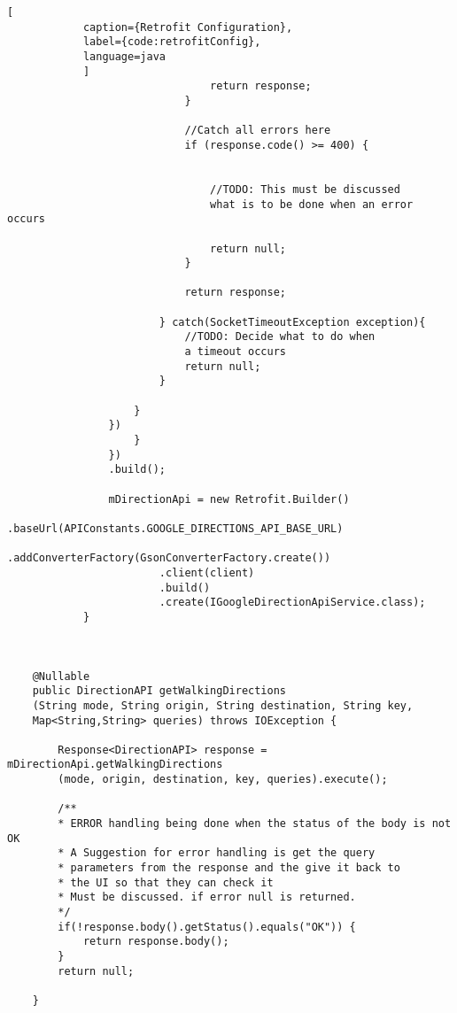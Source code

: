 \begin{lstlisting}[
            caption={Retrofit Configuration},
            label={code:retrofitConfig},
            language=java
            ]
                                return response;
                            }

                            //Catch all errors here
                            if (response.code() >= 400) {


                                //TODO: This must be discussed 
                                what is to be done when an error occurs

                                return null;
                            }

                            return response;

                        } catch(SocketTimeoutException exception){
                            //TODO: Decide what to do when 
                            a timeout occurs
                            return null;
                        }

                    }
                })
                    }
                })
                .build();

                mDirectionApi = new Retrofit.Builder()
                        .baseUrl(APIConstants.GOOGLE_DIRECTIONS_API_BASE_URL)
                        .addConverterFactory(GsonConverterFactory.create())
                        .client(client)
                        .build()
                        .create(IGoogleDirectionApiService.class);
            }


            
    @Nullable
    public DirectionAPI getWalkingDirections
    (String mode, String origin, String destination, String key, 
    Map<String,String> queries) throws IOException {
       
        Response<DirectionAPI> response = mDirectionApi.getWalkingDirections
        (mode, origin, destination, key, queries).execute();

        /**
        * ERROR handling being done when the status of the body is not OK
        * A Suggestion for error handling is get the query 
        * parameters from the response and the give it back to 
        * the UI so that they can check it
        * Must be discussed. if error null is returned.
        */
        if(!response.body().getStatus().equals("OK")) {
            return response.body();
        }
        return null;
        
    }

        \end{lstlisting}